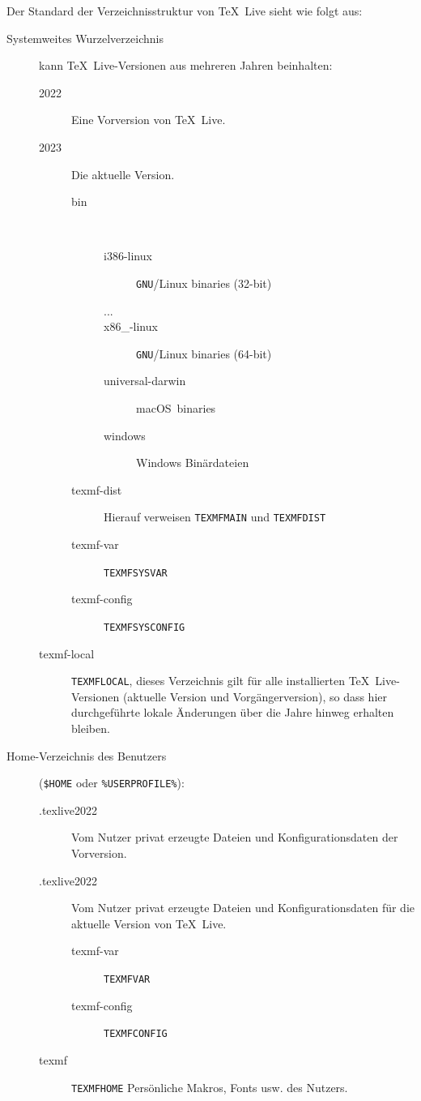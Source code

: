 \documentclass[12pt,ngerman,a4paper,fullparskip]{scrreprt}
\newcommand{\TL}{\TeX\ Live\xspace}
\newcommand{\acro}[1]{\texttt{#1}}
\newcommand{\envname}[1]{\texttt{#1}}
\providecommand*{\GNU}{\acro{GNU}\xspace}
\providecommand*{\macOS}{macOS\xspace}
\begin{document}
Der Standard der Verzeichnisstruktur von \TL sieht wie folgt aus:
\begin{description}
  \item[Systemweites Wurzelverzeichnis] kann \TL{}-Versionen aus mehreren Jahren beinhalten:
  \begin{description}
    \item[2022] Eine Vorversion von \TL.
    \item[2023] Die aktuelle Version.
    \begin{description}
      \item [bin] ~
      \begin{description}
        \item [i386-linux] \GNU/Linux binaries (32-bit)
        \item [...]
        \item [x86\_-linux] \GNU/Linux binaries (64-bit)
        \item [universal-darwin] \macOS\ binaries
        \item [windows] Windows Binärdateien
      \end{description}
      \item [texmf-dist\ \ ] Hierauf verweisen \envname{TEXMFMAIN} und \envname{TEXMFDIST}
      \item [texmf-var\ \ ] \envname{TEXMFSYSVAR}
      \item [texmf-config \ \ ] \envname{TEXMFSYSCONFIG}
    \end{description}
    \item [texmf-local] \envname{TEXMFLOCAL}, dieses Verzeichnis gilt für alle installierten \TL-Versionen
         (aktuelle Version und Vorgängerversion), so dass hier durchgeführte lokale Änderungen über die
         Jahre hinweg erhalten bleiben.
  \end{description}
  \item[Home-Verzeichnis des Benutzers]
      (\texttt{\$HOME} oder \texttt{\%USERPROFILE\%}):
    \begin{description}
      \item[.texlive2022] Vom Nutzer privat erzeugte Dateien und Konfigurationsdaten
        der Vorversion.
      \item[.texlive2022] Vom Nutzer privat erzeugte Dateien und Konfigurationsdaten
        für die aktuelle Version von \TL.
      \begin{description}
        \item [texmf-var\ \ \ ] \envname{TEXMFVAR}
        \item [texmf-config] \envname{TEXMFCONFIG}
      \end{description}
    \item[texmf] \envname{TEXMFHOME} Persönliche Makros, Fonts usw. des Nutzers.
  \end{description}
\end{description}
\end{document}
